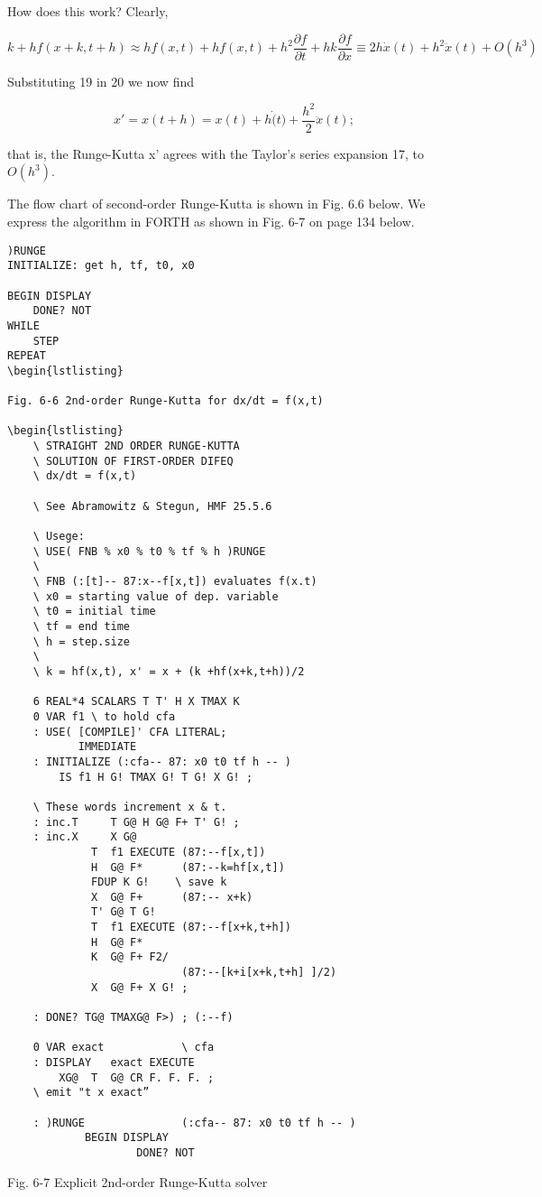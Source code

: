 How does this work? Clearly,

\begin{equation}
k + hf(x+k,t+h) \approx hf(x,t) + hf(x,t) + h^2\frac{\partial f}{\partial t} + hk \frac{\partial f}{\partial x}
\equiv 2h\dot{x}(t) + h^2\ddot{x}(t) + O(h^3)
\end{equation}

Substituting 19 in 20 we now find

\begin{equation}
x' = x(t+h) = x(t) + h\dot(t) + \frac{h^2}{2}\ddot{x}(t) ;
\end{equation}

that is, the Runge-Kutta x' agrees with the Taylor's series expansion 17, to $O(h^3)$.

The flow chart of second-order Runge-Kutta is shown in Fig. 6.6 below. We express the algorithm in FORTH as shown in Fig. 6-7 on page 134 below.

\begin{lstlisting}
)RUNGE
INITIALIZE: get h, tf, t0, x0

BEGIN DISPLAY
    DONE? NOT
WHILE
    STEP
REPEAT
\begin{lstlisting}

Fig. 6-6 2nd-order Runge-Kutta for dx/dt = f(x,t)

\begin{lstlisting}
    \ STRAIGHT 2ND ORDER RUNGE-KUTTA
    \ SOLUTION OF FIRST-ORDER DIFEQ
    \ dx/dt = f(x,t)

    \ See Abramowitz & Stegun, HMF 25.5.6

    \ Usege:
    \ USE( FNB % x0 % t0 % tf % h )RUNGE
    \
    \ FNB (:[t]-- 87:x--f[x,t]) evaluates f(x.t)
    \ x0 = starting value of dep. variable
    \ t0 = initial time
    \ tf = end time
    \ h = step.size
    \
    \ k = hf(x,t), x' = x + (k +hf(x+k,t+h))/2

    6 REAL*4 SCALARS T T' H X TMAX K
    0 VAR f1 \ to hold cfa
    : USE( [COMPILE]' CFA LITERAL;
           IMMEDIATE
    : INITIALIZE (:cfa-- 87: x0 t0 tf h -- )
        IS f1 H G! TMAX G! T G! X G! ;

    \ These words increment x & t.
    : inc.T     T G@ H G@ F+ T' G! ;
    : inc.X     X G@
             T  f1 EXECUTE (87:--f[x,t])
             H  G@ F*      (87:--k=hf[x,t])
             FDUP K G!    \ save k
             X  G@ F+      (87:-- x+k)
             T' G@ T G!
             T  f1 EXECUTE (87:--f[x+k,t+h])
             H  G@ F*
             K  G@ F+ F2/
                           (87:--[k+i[x+k,t+h] ]/2)
             X  G@ F+ X G! ;

    : DONE? TG@ TMAXG@ F>) ; (:--f)

    0 VAR exact            \ cfa
    : DISPLAY   exact EXECUTE
        XG@  T  G@ CR F. F. F. ;
    \ emit "t x exact”

    : )RUNGE               (:cfa-- 87: x0 t0 tf h -- )
            BEGIN DISPLAY
                    DONE? NOT
\end{lstlisting}
Fig. 6-7 Explicit 2nd-order Runge-Kutta solver

